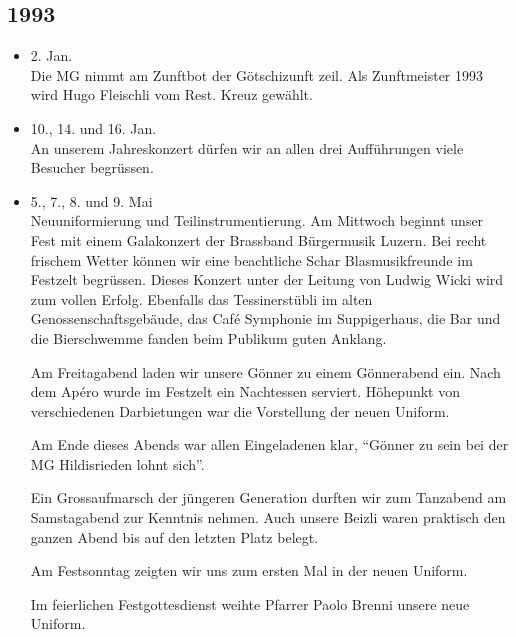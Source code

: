 \subsection{1993}

\begin{history}


    \begin{itemize}

        \item 2. Jan.\\
              Die MG nimmt am Zunftbot der Götschizunft zeil. Als Zunftmeister 1993
              wird Hugo Fleischli vom Rest. Kreuz gewählt.

        \item 10., 14. und 16. Jan.\\
              An unserem Jahreskonzert dürfen wir an allen drei Aufführungen viele
              Besucher begrüssen.

        \item 5., 7., 8. und 9. Mai\\
              Neuuniformierung und Teilinstrumentierung. Am Mittwoch beginnt unser
              Fest mit einem Galakonzert der Brassband Bürgermusik Luzern. Bei recht
              frischem Wetter können wir eine beachtliche Schar Blasmusikfreunde im
              Festzelt begrüssen. Dieses Konzert unter der Leitung von Ludwig Wicki
              wird zum vollen Erfolg. Ebenfalls das Tessinerstübli im alten
              Genossenschaftsgebäude, das Café Symphonie im Suppigerhaus, die Bar und
              die Bierschwemme fanden beim Publikum guten Anklang.

              Am Freitagabend laden wir unsere Gönner zu einem Gönnerabend ein. Nach
              dem Apéro wurde im Festzelt ein Nachtessen serviert. Höhepunkt von
              verschiedenen Darbietungen war die Vorstellung der neuen Uniform.

              Am Ende dieses Abends war allen Eingeladenen klar, \enquote{Gönner zu sein
                  bei der MG Hildisrieden lohnt sich}.

              Ein Grossaufmarsch der jüngeren Generation durften wir zum Tanzabend am
              Samstagabend zur Kenntnis nehmen. Auch unsere Beizli waren praktisch den
              ganzen Abend bis auf den letzten Platz belegt.

              Am Festsonntag zeigten wir uns zum ersten Mal in der neuen Uniform.

              Im feierlichen Festgottesdienst weihte Pfarrer Paolo Brenni unsere neue Uniform.


\end{itemize}
\end{history}
